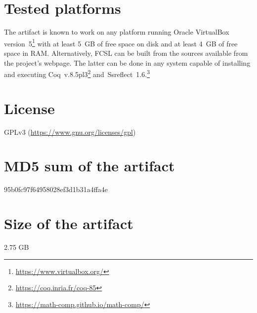 \documentclass[a4paper,USenglish]{darts}
\newenvironment{platforms}{\section{Tested platforms}}{}
\newcommand{\license}[1]{{\section{License}#1}}
\newcommand{\mdsum}[1]{{\section{MD5 sum of the artifact}#1}}
\newcommand{\artifactsize}[1]{{\section{Size of the artifact}#1}}
\begin{document}
\begin{platforms}
  The artifact is known to work on any platform running Oracle
  VirtualBox version~5\footnote{\url{https://www.virtualbox.org/}}
  with at least 5~GB of free space on disk and at least 4~GB of free
  space in RAM. Alternatively, FCSL can be built from the sources
  available from the project's webpage. The latter can be done in any
  system capable of installing and executing
  Coq~v.8.5pl3\footnote{\url{https://coq.inria.fr/coq-85}}
  and~Ssreflect~1.6.\footnote{\url{https://math-comp.github.io/math-comp/}}
\end{platforms}

\license{GPLv3 (\url{https://www.gnu.org/licenses/gpl})}

\mdsum{95b0fc97f64958028ef3d1b31a4ffa4e}

\artifactsize{2.75 GB}


\end{document}
